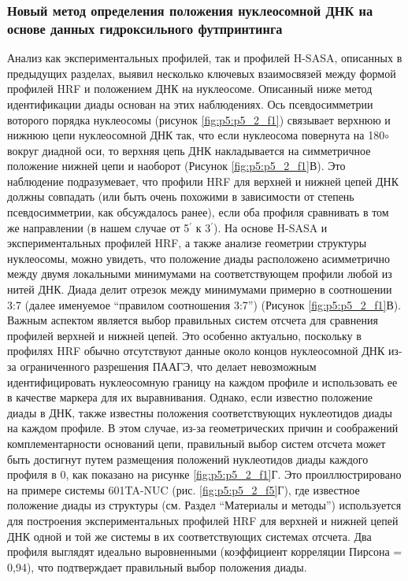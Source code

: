 \subsubsection{Новый метод определения положения нуклеосомной ДНК на основе данных гидроксильного футпринтинга}
Анализ как экспериментальных профилей, так и профилей H-SASA, описанных в предыдущих разделах, выявил несколько ключевых взаимосвязей между формой профилей HRF и положением ДНК на нуклеосоме. Описанный ниже метод идентификации диады основан на этих наблюдениях. Ось псевдосимметрии воторого порядка нуклеосомы (рисунок \ref{fig:p5:p5_2_f1}) связывает верхнюю и нижнюю цепи нуклеосомной ДНК так, что если нуклеосома повернута на 180$\circ$ вокруг диадной оси, то верхняя цепь ДНК накладывается на симметричное положение нижней цепи и наоборот (Рисунок \ref{fig:p5:p5_2_f1}В). Это наблюдение подразумевает, что профили HRF для верхней и нижней цепей ДНК должны совпадать (или быть очень похожими в зависимости от степень псевдосимметрии, как обсуждалось ранее), если оба профиля сравнивать в том же направлении (в нашем случае от 5$^\prime$ к 3$^\prime$). На основе H-SASA и экспериментальных профилей HRF, а также анализе геометрии структуры нуклеосомы, можно увидеть, что положение диады расположено асимметрично между двумя локальными минимумами на соответствующем профили любой из нитей ДНК. Диада делит отрезок между минимумами примерно в соотношении 3:7 (далее именуемое ``правилом соотношения 3:7'') (Рисунок \ref{fig:p5:p5_2_f1}В).
Важным аспектом является выбор правильных систем отсчета для сравнения профилей верхней и нижней цепей. Это особенно актуально, поскольку в профилях HRF обычно отсутствуют данные около концов нуклеосомной ДНК из-за ограниченного разрешения ПААГЭ, что делает невозможным идентифицировать нуклеосомную границу на каждом профиле и использовать ее в качестве маркера для их выравнивания. Однако, если известно положение диады в ДНК, также известны положения соответствующих нуклеотидов диады на каждом профиле. В этом случае, из-за геометрических причин и соображений комплементарности оснований цепи, правильный выбор систем отсчета может быть достигнут путем размещения положений нуклеотидов диады каждого профиля в 0, как показано на рисунке \ref{fig:p5:p5_2_f1}Г. Это проиллюстрировано на примере системы 601TA-NUC (рис. \ref{fig:p5:p5_2_f5}Г), где известное положение диады из структуры (см. Раздел ``Материалы и методы'') используется для построения экспериментальных профилей HRF для верхней и нижней цепей ДНК одной и той же системы в их соответствующих системах отсчета. Два профиля выглядят идеально выровненными (коэффициент корреляции Пирсона = 0,94), что подтверждает правильный выбор положения диады.
